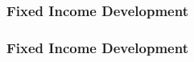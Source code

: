 \documentclass[compress]{beamer}
\begin{document}
\begin{frame}
	\frametitle{Fixed Income Development}

	\begin{center}
	\end{center}
\end{frame}
\begin{frame}
	\frametitle{Fixed Income Development}
	\textcolor{white}{}
	\begin{center}
	\end{center}
\end{frame}
\end{document}
